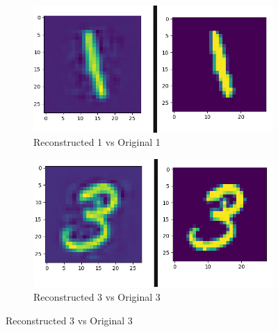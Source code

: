 \documentclass[a4paper,10pt]{article}
\begin{document}
 \begin{figure}[h]
 \begin{subfigure}{.5\textwidth}
 \centering
 \includegraphics[scale=0.35]{Results/SPAMS_X_ALL_K256/recons_1.png}
  \caption{Reconstructed 1 vs Original 1}
 \end{subfigure}%
  \begin{subfigure}{.3\textwidth}
 \centering
 \includegraphics[scale=0.35]{Results/SPAMS_X_ALL_K256/recons_3.png}
  \caption{Reconstructed 3 vs Original 3}

 \end{subfigure}%
\end{figure}

\newpage
\end{document}

